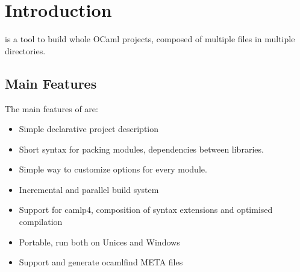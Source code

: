 
\chapter{Introduction}

\ocpbuild{} is a tool to build whole OCaml projects, composed of
multiple files in multiple directories. 

\section{Main Features}

The main features of \ocpbuild{} are:

\begin{itemize}
\item Simple declarative project description
\item Short syntax for packing modules, 
  dependencies between libraries.
\item Simple way to customize options for every module.
\item Incremental and parallel build system
\item Support for camlp4, composition of syntax extensions and
  optimised compilation
\item Portable, run both on Unices and Windows
\item Support and generate ocamlfind META files
\end{itemize}

